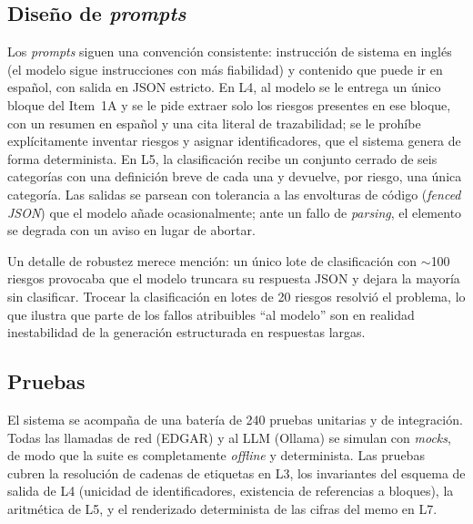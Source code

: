 \documentclass[conference]{IEEEtran}
\begin{document}
\subsection{Diseño de \textit{prompts}}
Los \textit{prompts} siguen una convención consistente: instrucción de sistema en
inglés (el modelo sigue instrucciones con más fiabilidad) y contenido que puede
ir en español, con salida en JSON estricto. En L4, al modelo se le entrega un
único bloque del Item~1A y se le pide extraer solo los riesgos presentes en ese
bloque, con un resumen en español y una cita literal de trazabilidad; se le
prohíbe explícitamente inventar riesgos y asignar identificadores, que el sistema
genera de forma determinista. En L5, la clasificación recibe un conjunto cerrado
de seis categorías con una definición breve de cada una y devuelve, por riesgo,
una única categoría. Las salidas se parsean con tolerancia a las envolturas de
código (\textit{fenced JSON}) que el modelo añade ocasionalmente; ante un fallo de
\textit{parsing}, el elemento se degrada con un aviso en lugar de abortar.

Un detalle de robustez merece mención: un único lote de clasificación con $\sim$100
riesgos provocaba que el modelo truncara su respuesta JSON y dejara la mayoría sin
clasificar. Trocear la clasificación en lotes de 20 riesgos resolvió el problema,
lo que ilustra que parte de los fallos atribuibles ``al modelo'' son en realidad
inestabilidad de la generación estructurada en respuestas largas.

\subsection{Pruebas}
El sistema se acompaña de una batería de 240 pruebas unitarias y de integración.
Todas las llamadas de red (EDGAR) y al LLM (Ollama) se simulan con
\textit{mocks}, de modo que la suite es completamente \textit{offline} y
determinista. Las pruebas cubren la resolución de cadenas de etiquetas en L3, los
invariantes del esquema de salida de L4 (unicidad de identificadores, existencia
de referencias a bloques), la aritmética de L5, y el renderizado determinista de
las cifras del memo en L7.
\end{document}

